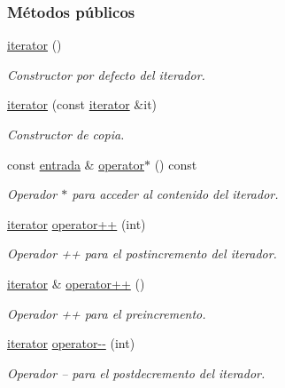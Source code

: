 \subsubsection*{Métodos públicos}
\begin{DoxyCompactItemize}
\item 
\hyperlink{classconjunto_1_1iterator_ae3ade272e78f6888c39ad44a8b4b152a}{iterator} ()
\begin{DoxyCompactList}\small\item\em Constructor por defecto del iterador. \end{DoxyCompactList}\item 
\hyperlink{classconjunto_1_1iterator_a3bf3696bc5d44e24cb78e9a7401c047c}{iterator} (const \hyperlink{classconjunto_1_1iterator}{iterator} \&it)
\begin{DoxyCompactList}\small\item\em Constructor de copia. \end{DoxyCompactList}\item 
const \hyperlink{classconjunto_a09cad766dd65de73e51eae21f9d22585}{entrada} \& \hyperlink{classconjunto_1_1iterator_af2e4902c07e0f553fd69a1d1ebf00529}{operator$\ast$} () const 
\begin{DoxyCompactList}\small\item\em Operador $\ast$ para acceder al contenido del iterador. \end{DoxyCompactList}\item 
\hyperlink{classconjunto_1_1iterator}{iterator} \hyperlink{classconjunto_1_1iterator_af678148966f3d71b566a390e453f401d}{operator++} (int)
\begin{DoxyCompactList}\small\item\em Operador ++ para el postincremento del iterador. \end{DoxyCompactList}\item 
\hyperlink{classconjunto_1_1iterator}{iterator} \& \hyperlink{classconjunto_1_1iterator_a8f377a56a467417eb3afe6bcfd2597de}{operator++} ()
\begin{DoxyCompactList}\small\item\em Operador ++ para el preincremento. \end{DoxyCompactList}\item 
\hyperlink{classconjunto_1_1iterator}{iterator} \hyperlink{classconjunto_1_1iterator_a743275bad5eabf7e5293591feaf5e236}{operator-\/-\/} (int)
\begin{DoxyCompactList}\small\item\em Operador -- para el postdecremento del iterador. \end{DoxyCompactList}\item 

\end{DoxyCompactItemize}
